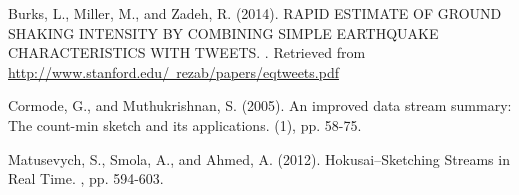 \documentclass[twoside]{article}
\begin{document}

\begin{thebibliography}{99} %


Burks, L., Miller, M., and Zadeh, R. (2014). 
\newblock RAPID ESTIMATE OF GROUND SHAKING INTENSITY BY COMBINING SIMPLE EARTHQUAKE CHARACTERISTICS WITH TWEETS. 
. Retrieved from \href{http://www.stanford.edu/~rezab/papers/eqtweets.pdf}{http://www.stanford.edu/~rezab/papers/eqtweets.pdf}

Cormode, G., and Muthukrishnan, S. (2005). 
\newblock An improved data stream summary: The count-min sketch and its applications. 
(1), pp. 58-75.

Matusevych, S., Smola, A., and Ahmed, A. (2012).
\newblock Hokusai--Sketching Streams in Real Time.
, pp. 594-603.


 
\end{thebibliography}

\end{document}
